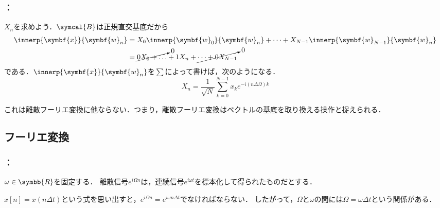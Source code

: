 \documentclass[unicode,11pt]{beamer}
\newcommand{\impact}[1]{\alert{\sffamily #1}}
\newcommand{\numset}[1]{\symbb{#1}}
\newcommand{\vb}[1]{\symbf{#1}}
\newcommand{\basis}[1]{\symcal{#1}}
\begin{document}
\begin{frame}
  \frametitle{\secname ：\subsecname}
  \(X_n\)を求めよう．\(\basis{B}\)は正規直交基底だから
  \begin{align*}
    \innerp{\vb{x}}{\vb{w}_n} &= X_0\innerp{\vb{w}_0}{\vb{w}_n}+\dots+X_{N-1}\innerp{\vb{w}_{N-1}}{\vb{w}_n} \\
    &= \cancelto{0}{0X_0+\dots}+1X_n+\cancelto{0}{\dots+0X_{N-1}}
  \end{align*}
  である．\(\innerp{\vb{x}}{\vb{w}_n}\)を\(\sum\)によって書けば，次のようになる．
  \[
    X_n = \frac{1}{\sqrt{N}}\sum_{k=0}^{N-1}x_ke^{-i(n\Delta\Omega)k}
  \]

  これは離散フーリエ変換に他ならない．つまり，\impact{離散フーリエ変換はベクトルの基底を取り換える操作}と捉えられる．
\end{frame}

\subsection{フーリエ変換}
\begin{frame}
  \frametitle{\secname ：\subsecname}
  \begin{block}{\subsecname}
    \(\omega\in\numset{R}\)を固定する．
    離散信号\(e^{i\Omega n}\)は，連続信号\(e^{i\omega t}\)を標本化して得られたものだとする．
  
    \(x[n]=x(n\Delta t)\)という式を思い出すと，\(e^{i\Omega n}=e^{i\omega n\Delta t}\)でなければならない．
    したがって，\(\Omega\)と\(\omega\)の間には\(\Omega=\omega\Delta t\)という関係がある．      
  \end{block}
\end{frame}
\end{document}
